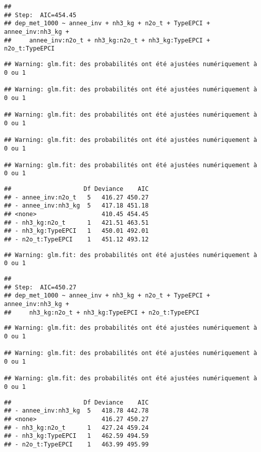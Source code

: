 \documentclass[
]{article}
\begin{document}
\begin{verbatim}
## 
## Step:  AIC=454.45
## dep_met_1000 ~ annee_inv + nh3_kg + n2o_t + TypeEPCI + annee_inv:nh3_kg + 
##     annee_inv:n2o_t + nh3_kg:n2o_t + nh3_kg:TypeEPCI + n2o_t:TypeEPCI
\end{verbatim}

\begin{verbatim}
## Warning: glm.fit: des probabilités ont été ajustées numériquement à 0 ou 1

## Warning: glm.fit: des probabilités ont été ajustées numériquement à 0 ou 1

## Warning: glm.fit: des probabilités ont été ajustées numériquement à 0 ou 1

## Warning: glm.fit: des probabilités ont été ajustées numériquement à 0 ou 1

## Warning: glm.fit: des probabilités ont été ajustées numériquement à 0 ou 1
\end{verbatim}

\begin{verbatim}
##                    Df Deviance    AIC
## - annee_inv:n2o_t   5   416.27 450.27
## - annee_inv:nh3_kg  5   417.18 451.18
## <none>                  410.45 454.45
## - nh3_kg:n2o_t      1   421.51 463.51
## - nh3_kg:TypeEPCI   1   450.01 492.01
## - n2o_t:TypeEPCI    1   451.12 493.12
\end{verbatim}

\begin{verbatim}
## Warning: glm.fit: des probabilités ont été ajustées numériquement à 0 ou 1
\end{verbatim}

\begin{verbatim}
## 
## Step:  AIC=450.27
## dep_met_1000 ~ annee_inv + nh3_kg + n2o_t + TypeEPCI + annee_inv:nh3_kg + 
##     nh3_kg:n2o_t + nh3_kg:TypeEPCI + n2o_t:TypeEPCI
\end{verbatim}

\begin{verbatim}
## Warning: glm.fit: des probabilités ont été ajustées numériquement à 0 ou 1

## Warning: glm.fit: des probabilités ont été ajustées numériquement à 0 ou 1

## Warning: glm.fit: des probabilités ont été ajustées numériquement à 0 ou 1
\end{verbatim}

\begin{verbatim}
##                    Df Deviance    AIC
## - annee_inv:nh3_kg  5   418.78 442.78
## <none>                  416.27 450.27
## - nh3_kg:n2o_t      1   427.24 459.24
## - nh3_kg:TypeEPCI   1   462.59 494.59
## - n2o_t:TypeEPCI    1   463.99 495.99
\end{verbatim}
\end{document}
